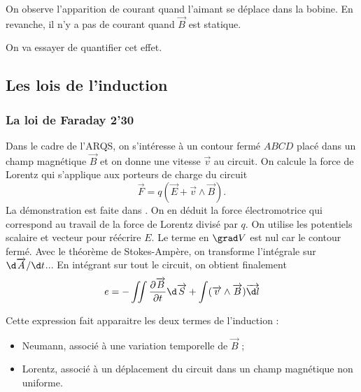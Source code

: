 \begin{experience}
On observe l'apparition de courant quand l'aimant se déplace dans la bobine. En revanche, il n'y a pas de courant quand $\overrightarrow{B}$ est statique.
\end{experience}

\begin{transition}
On va essayer de quantifier cet effet.
\end{transition}

\subsection{Les lois de l'induction}

\subsubsection{La loi de Faraday 2'30}

Dans le cadre de l'ARQS, on s'intéresse à un contour fermé $ABCD$ placé dans un champ magnétique $\overrightarrow{B}$ et on donne une vitesse $\overrightarrow{v}$ au circuit.
On calcule la force de Lorentz qui s'applique aux porteurs de charge du circuit
\begin{equation}
\overrightarrow{F} = q(\overrightarrow{E} + \overrightarrow{v}\wedge\overrightarrow{B}).
\end{equation}
La démonstration est faite dans \cite{Perez2009}.
On en déduit la force électromotrice qui correspond au travail de la force de Lorentz divisé par $q$.
On utilise les potentiels scalaire et vecteur pour réécrire $E$.
Le terme en $\grad V$ est nul car le contour fermé.
Avec le théorème de Stokes-Ampère, on transforme l'intégrale sur $\d\overrightarrow{A}/\d t$...
En intégrant sur tout le circuit, on obtient finalement
\begin{equation}
e=-\iint \frac{\partial\overrightarrow{B}}{\partial t}\d \overrightarrow{S} + \int (\overrightarrow{v}\wedge\overrightarrow{B})\overrightarrow{\d l}
\end{equation}

Cette expression fait apparaitre les deux termes de l'induction :
\begin{itemize}
\item Neumann, associé à une variation temporelle de $\overrightarrow{B}$ ;
\item Lorentz, associé à un déplacement du circuit dans un champ magnétique non uniforme.
\end{itemize}

